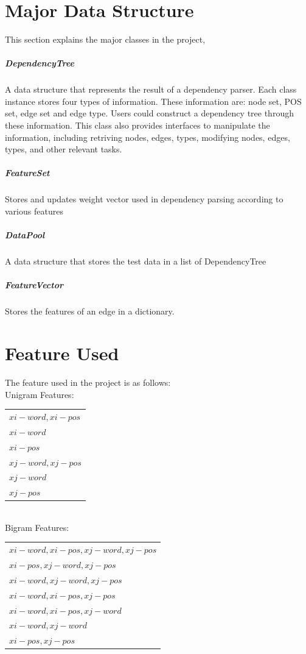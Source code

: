 \documentclass[11pt]{article}
\begin{document}
\section{Major Data Structure}

This section explains the major classes in the project,

\subparagraph{DependencyTree}
A data structure that represents the result of a dependency parser. Each class instance stores four types of information. These information are: node set, POS set, edge set and edge type. Users could construct a dependency tree through these information. This class also provides interfaces to manipulate the information, including retriving nodes, edges, types, modifying nodes, edges, types, and other relevant tasks.

\subparagraph{FeatureSet}
Stores and updates weight vector used in dependency parsing according to
various features

\subparagraph{DataPool}
A data structure that stores the test data in a list of DependencyTree

\subparagraph{FeatureVector}
Stores the features of an edge in a dictionary.


\section{Feature Used}

The feature used in the project is as follows: \\


Unigram Features: \\

\begin{tabular}{|l|}
	\hline
		$xi-word, xi-pos$ \\
		$xi-word$ \\
		$xi-pos$ \\
		$xj-word, xj-pos$ \\
		$xj-word$ \\
		$xj-pos$ \\
	\hline
\end{tabular} \\




Bigram Features: \\

\begin{tabular}{|l| }
	\hline
		$xi-word, xi-pos, xj-word, xj-pos$ \\
		$xi-pos, xj-word, xj-pos$ \\
		$xi-word, xj-word, xj-pos$ \\
		$xi-word, xi-pos, xj-pos$ \\
		$xi-word, xi-pos, xj-word$ \\
		$xi-word, xj-word$ \\
		$xi-pos, xj-pos$ \\
	\hline
\end{tabular} \\
\end{document}
